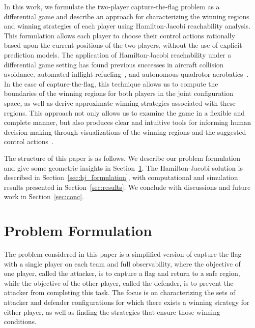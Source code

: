 \documentclass[letterpaper, 10 pt, conference]{ieeeconf}  %
\numberwithin{algorithm}{section}
\begin{document}
In this work, we formulate the two-player capture-the-flag problem as a differential game and describe an approach for characterizing the winning regions and winning strategies of each player using Hamilton-Jacobi reachability analysis. This formulation allows each player to choose their control actions rationally based upon the current positions of the two players, without the use of explicit prediction models. The application of Hamilton-Jacobi reachability under a differential game setting has found previous successes in aircraft collision avoidance\cite{j:mitchell-TAC-2005}, automated inflight-refueling~\cite{DSST08}, and autonomous quadrotor aerobatics~\cite{GHVT09b}. In the case of capture-the-flag, this technique allows us to compute the boundaries of the winning regions for both players in the joint configuration space, as well as derive approximate winning strategies associated with these regions. This approach not only allows us to examine the game in a flexible and complete manner, but also produces clear and intuitive tools for informing human decision-making through visualizations of the winning regions and the suggested control actions~\cite{Oishi:2008p98}. 

The structure of this paper is as follows. We describe our problem formulation and give some geometric insights in Section~\ref{sec:formulation}. The Hamilton-Jacobi solution is described in Section~\ref{sec:hj_formulation}, with computational and simulation results presented in Section~\ref{sec:results}. We conclude with discussions and future work in Section~\ref{sec:conc}. 

\section{Problem Formulation}
\label{sec:formulation}
The problem considered in this paper is a simplified version of capture-the-flag with a single player on each team and full observability, where the objective of one player, called the attacker, is to capture a flag and return to a safe region, while the objective of the other player, called the defender, is to prevent the attacker from completing this task. The focus is on characterizing the sets of attacker and defender configurations for which there exists a winning strategy for either player, as well as finding the strategies that ensure those winning conditions. 
\end{document}
